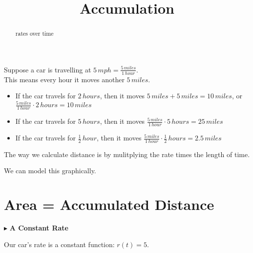 \documentclass{ximera}
\title{Accumulation}
\begin{document}
\begin{abstract}
rates over time
\end{abstract}
\maketitle



Suppose a car is travelling at $5 \, mph = \frac{5 \, miles}{1 \, hour}$. \\

This means every hour it moves another $5 \, miles$. \\

\begin{itemize}
\item If the car travels for $2 \, hours$, then it moves $5 \, miles + 5 \, miles = 10 \, miles$, or $\frac{5 \, miles}{1 \, hour} \cdot 2 \, hours = 10 \, miles$

\item If the car travels for $5 \, hours$, then it moves $\frac{5 \, miles}{1 \, hour} \cdot 5 \, hours = 25 \, miles$

\item If the car travels for $\frac{1}{2} \, hour$, then it moves $\frac{5 \, miles}{1 \, hour} \cdot \frac{1}{2} \, hours = 2.5 \,miles$
\end{itemize}


The way we calculate distance is by mulitplying the rate times the length of time.

We can model this graphically.










\section*{Area = Accumulated Distance}



$\blacktriangleright$ \textbf{A Constant Rate}



Our car's rate is a constant function: $r(t) = 5$. \\
\end{document}
